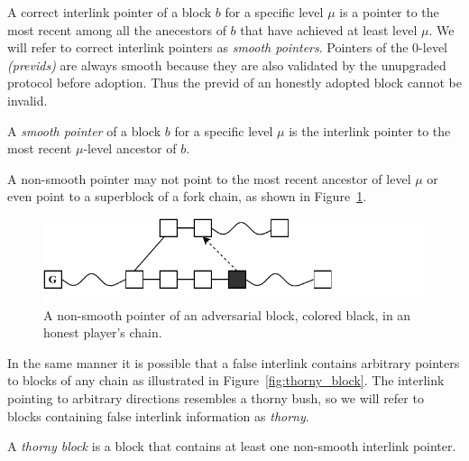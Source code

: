 A correct interlink pointer of a block $b$ for a specific level $\mu$ is a pointer to the most recent among all the anecestors of $b$ that have achieved at least level $\mu$. We will refer to correct interlink pointers as \emph{smooth pointers}. Pointers of the 0-level \textit{(previds)} are always smooth because they are also validated by the unupgraded protocol before adoption. Thus the previd of an
honestly adopted block cannot be invalid.

\begin{definition}
  A \emph{smooth pointer} of a block $b$ for a specific level $\mu$ is the interlink pointer to the most recent $\mu$-level ancestor of $b$.
	\label{defn:smooth_pointer}
\end{definition}

A non-smooth pointer may not point to the most recent ancestor of level $\mu$ or even point to a superblock of a fork chain, as shown in Figure~\ref{fig:false_interlink}.

\begin{figure}[h]
	\begin{center}
		\includegraphics[width=0.9\columnwidth]{figures/false_interlink.pdf}
	\end{center}
    \caption{A non-smooth pointer of an adversarial block, colored black, in an honest player's chain.}
	\label{fig:false_interlink}
\end{figure}

In the same manner it is possible that a false interlink contains arbitrary pointers to blocks of any chain as illustrated in Figure~\ref{fig:thorny_block}. The interlink pointing to arbitrary directions resembles a thorny bush, so we will refer to blocks containing false interlink information as \emph{thorny}.

\begin{definition}
	A \emph{thorny block} is a block that contains at least one non-smooth interlink pointer.
	\label{defn:thorny_block}
\end{definition}


